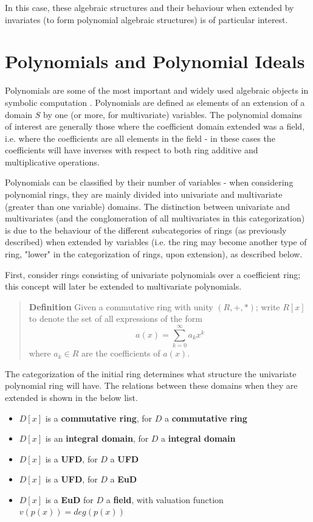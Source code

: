 \documentclass[letterpaper,12pt,titlepage,oneside,final]{book}
\newenvironment{defn}{\begin{quote}%
  \textbf{Definition }%
  \quad
}{%
\end{quote}%
}
\begin{document}
In this case, these algebraic structures and their behaviour when extended by invariates (to form polynomial algebraic structures) is of particular interest.

\section{Polynomials and Polynomial Ideals}

Polynomials are some of the most important and widely used algebraic objects in symbolic computation \cite{Geddes}.  Polynomials are defined as elements of an extension of a domain ${S}$ by one (or more, for multivariate) variables.  The polynomial domains of interest are generally those where the coefficient domain extended was a field, i.e. where the coefficients are all elements in the field - in these cases the coefficients will have inverses with respect to both ring additive and multiplicative operations.  

Polynomials can be classified by their number of variables - when considering polynomial rings, they are mainly divided into univariate and multivariate (greater than one variable) domains.  The distinction between univariate and multivariates (and the conglomeration of all multivariates in this categorization) is due to the behaviour of the different subcategories of rings (as previously described) when extended by variables (i.e. the ring may become another type of ring, "lower" in the categorization of rings, upon extension), as described below.

First, consider rings consisting of univariate polynomials over a coefficient ring; this concept will later be extended to multivariate polynomials.

\begin{defn}\label{defn: Univariate Polynomial Space}
  Given a commutative ring with unity ${(R, +, *)}$; write ${R[x]}$ to denote the set of all expressions of the form
  \begin{equation*}
    a(x) = \sum_{k=0}^{\infty} a_k x^k
  \end{equation*}
  where ${a_k \in R}$ are the coefficients of ${a(x)}$. 
\end{defn}

The categorization of the initial ring determines what structure the univariate polynomial ring will have.  The relations between these domains when they are extended is shown in the below list.
\begin{itemize}
  \item ${D[x]}$ is a \textbf{commutative ring}, for ${D}$ a \textbf{commutative ring} 
  \item ${D[x]}$ is an \textbf{integral domain}, for ${D}$ a \textbf{integral domain} 
  \item ${D[x]}$ is a \textbf{UFD}, for ${D}$ a \textbf{UFD}
  \item ${D[x]}$ is a \textbf{UFD}, for ${D}$ a \textbf{EuD}
  \item ${D[x]}$ is a \textbf{EuD} for ${D}$ a \textbf{field}, with valuation function ${v(p(x)) = deg(p(x))}$ 
\end{itemize}  
\end{document}
